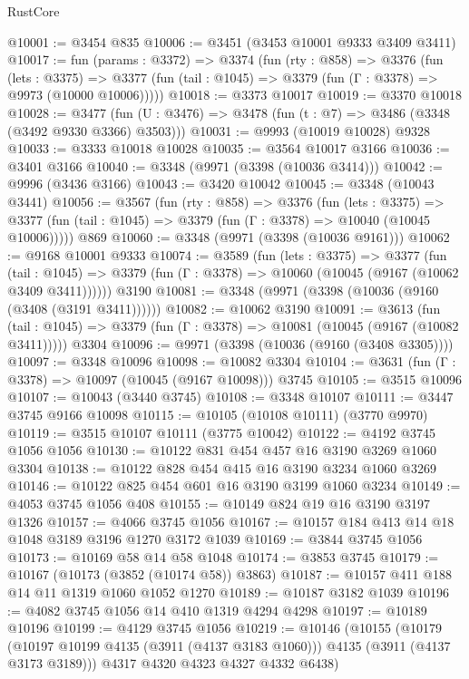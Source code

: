 \begin{lexlean}{RustCore}
\begin{coremodule}
@10001 := @3454 @835
@10006 := @3451 (@3453 @10001 @9333 @3409 @3411)
@10017 := fun (params : @3372) =>
  @3374
    (fun (rty : @858) =>
    @3376
      (fun (lets : @3375) =>
      @3377 (fun (tail : @1045) => @3379 (fun (Γ : @3378) => @9973 (@10000 @10006)))))
@10018 := @3373 @10017
@10019 := @3370 @10018
@10028 := @3477 (fun (U : @3476) => @3478 (fun (t : @7) => @3486 (@3348 (@3492 @9330 @3366) @3503)))
@10031 := @9993 (@10019 @10028) @9328
@10033 := @3333 @10018 @10028
@10035 := @3564 @10017 @3166
@10036 := @3401 @3166
@10040 := @3348 (@9971 (@3398 (@10036 @3414)))
@10042 := @9996 (@3436 @3166)
@10043 := @3420 @10042
@10045 := @3348 (@10043 @3441)
@10056 := @3567
    (fun (rty : @858) =>
    @3376
      (fun (lets : @3375) =>
      @3377 (fun (tail : @1045) => @3379 (fun (Γ : @3378) => @10040 (@10045 @10006)))))
    @869
@10060 := @3348 (@9971 (@3398 (@10036 @9161)))
@10062 := @9168 @10001 @9333
@10074 := @3589
    (fun (lets : @3375) =>
    @3377
      (fun (tail : @1045) =>
      @3379 (fun (Γ : @3378) => @10060 (@10045 (@9167 (@10062 @3409 @3411))))))
    @3190
@10081 := @3348 (@9971 (@3398 (@10036 (@9160 (@3408 (@3191 @3411))))))
@10082 := @10062 @3190
@10091 := @3613
    (fun (tail : @1045) => @3379 (fun (Γ : @3378) => @10081 (@10045 (@9167 (@10082 @3411)))))
    @3304
@10096 := @9971 (@3398 (@10036 (@9160 (@3408 @3305))))
@10097 := @3348 @10096
@10098 := @10082 @3304
@10104 := @3631 (fun (Γ : @3378) => @10097 (@10045 (@9167 @10098))) @3745
@10105 := @3515 @10096
@10107 := @10043 (@3440 @3745)
@10108 := @3348 @10107
@10111 := @3447 @3745 @9166 @10098
@10115 := @10105 (@10108 @10111) (@3770 @9970)
@10119 := @3515 @10107 @10111 (@3775 @10042)
@10122 := @4192 @3745 @1056 @1056
@10130 := @10122 @831 @454 @457 @16 @3190 @3269 @1060 @3304
@10138 := @10122 @828 @454 @415 @16 @3190 @3234 @1060 @3269
@10146 := @10122 @825 @454 @601 @16 @3190 @3199 @1060 @3234
@10149 := @4053 @3745 @1056 @408
@10155 := @10149 @824 @19 @16 @3190 @3197 @1326
@10157 := @4066 @3745 @1056
@10167 := @10157 @184 @413 @14 @18 @1048 @3189 @3196 @1270 @3172 @1039
@10169 := @3844 @3745 @1056
@10173 := @10169 @58 @14 @58 @1048
@10174 := @3853 @3745
@10179 := @10167 (@10173 (@3852 (@10174 @58)) @3863)
@10187 := @10157 @411 @188 @14 @11 @1319 @1060 @1052 @1270
@10189 := @10187 @3182 @1039
@10196 := @4082 @3745 @1056 @14 @410 @1319 @4294 @4298
@10197 := @10189 @10196
@10199 := @4129 @3745 @1056
@10219 := @10146
    (@10155
      (@10179 (@10197 @10199 @4135 (@3911 (@4137 @3183 @1060))) @4135 (@3911 (@4137 @3173 @3189)))
      @4317
      @4320
      @4323
      @4327
      @4332
      @6438)

\end{coremodule}
\end{lexlean}
